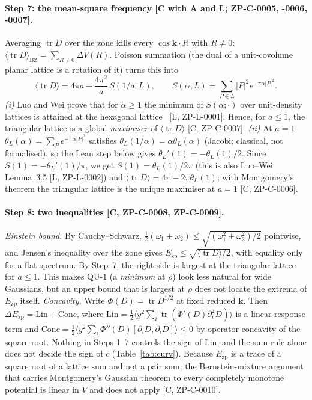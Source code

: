 \documentclass[10pt]{article}
\newcommand{\tier}[1]{\textsf{[#1]}}
\newcommand{\Ezp}{E_{\mathrm{zp}}}
\newcommand{\tr}{\operatorname{tr}}
\begin{document}
\paragraph{Step 7: the mean-square frequency \tier{C with A and L; ZP-C-0005, -0006, -0007}.} Averaging $\tr D$ over the zone kills every $\cos\mathbf k\!\cdot\!R$ with $R\ne0$:
$\langle\tr D\rangle_{\mathrm{BZ}}=\sum_{R\ne0}\Delta V(R)$. Poisson summation (the dual of a unit-covolume planar lattice is a rotation of it) turns this into
\[\langle\tr D\rangle=4\pi a-\frac{4\pi^2}{a}\,S(1/a;L),\qquad S(\alpha;L)=\sum_{P\in L}|P|^2e^{-\pi\alpha|P|^2}.\]
\emph{(i)} Luo and Wei prove that for $\alpha\ge1$ the minimum of $S(\alpha;\cdot)$ over unit-density lattices is attained at the hexagonal lattice~\cite{luowei}
\tier{L, ZP-L-0001}. Hence, for $a\le1$, the triangular lattice is a global \emph{maximiser} of $\langle\tr D\rangle$ \tier{C, ZP-C-0007}. \emph{(ii)} At $a=1$,
$\theta_L(\alpha)=\sum_Pe^{-\pi\alpha|P|^2}$ satisfies $\theta_L(1/\alpha)=\alpha\theta_L(\alpha)$ (Jacobi; classical, not formalised), so the Lean step below gives $\theta_L'(1)=-\theta_L(1)/2$.
Since $S(1)=-\theta_L'(1)/\pi$, we get $S(1)=\theta_L(1)/2\pi$ (this is also Luo--Wei Lemma~3.5 \tier{L, ZP-L-0002}) and
$\langle\tr D\rangle=4\pi-2\pi\theta_L(1)$; with Montgomery's theorem the triangular lattice is the unique maximiser at $a=1$ \tier{C, ZP-C-0006}.


\paragraph{Step 8: two inequalities \tier{C, ZP-C-0008, ZP-C-0009}.} \emph{Einstein bound.} By Cauchy--Schwarz, $\tfrac12(\omega_1+\omega_2)\le\sqrt{(\omega_1^2+\omega_2^2)/2}$ pointwise,
and Jensen's inequality over the zone gives $\Ezp\le\sqrt{\langle\tr D\rangle/2}$, with equality only for a flat spectrum. By Step~7, the right side is largest at the
triangular lattice for $a\le1$. This makes QU-1 (a \emph{minimum} at $\rho$) look less natural for wide Gaussians, but an upper bound that is largest at $\rho$ does not
locate the extrema of $\Ezp$ itself. \emph{Concavity.} Write $\Phi(D)=\tr D^{1/2}$ at fixed reduced $\mathbf k$. Then $\Delta\Ezp=\mathrm{Lin}+\mathrm{Conc}$, where
$\mathrm{Lin}=\tfrac12\langle y^2\sum_i\tr(\Phi'(D)\partial_i^2D)\rangle$ is a linear-response term and $\mathrm{Conc}=\tfrac12\langle y^2\sum_i\Phi''(D)[\partial_iD,\partial_iD]\rangle\le0$ by
operator concavity of the square root. Nothing in Steps 1--7 controls the sign of $\mathrm{Lin}$, and the sum rule alone does not decide the sign of $c$ (Table~\ref{tab:curv}).
Because $\Ezp$ is a trace of a square root of a lattice sum and not a pair sum, the Bernstein-mixture argument that carries Montgomery's Gaussian theorem to every completely monotone
potential is linear in $V$ and does not apply \tier{C, ZP-C-0010}.
\end{document}
